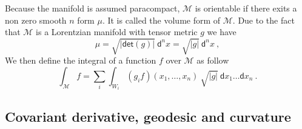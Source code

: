 \documentclass[11pt]{book}
\renewcommand{\det}{\mathsf{det}}
\newcommand{\abs}[1]{\left|#1\right|}
\newcommand{\Mcal}{\mathcal{M}}
\newcommand{\dsf}{\mathsf{d}}
\theoremstyle{break}
\begin{document}
Because the manifold is assumed paracompact, $\Mcal$ is orientable if there exits a non zero smooth $n$ form $\mu$. It is called the volume form of $\Mcal$. Due to the fact that $\Mcal$ is a Lorentzian manifold with tensor metric $g$ we have 
%
\begin{equation*}
\mu = \sqrt{\abs{\det\left(g\right)}} \ \dsf^n x = \sqrt{\abs{g}} \ \dsf^n x \ ,
\end{equation*}
%
We then define the integral of a function $f$ over $\Mcal$ as follow
%
\begin{equation}
\int_\Mcal f = \sum_i \int_{W_i} (g_i f)(x_1,\dots,x_n) \ \sqrt{\abs{g}} \ \dsf x_1 \dots \dsf x_n \ .
\label{eq:int_manifold}
\end{equation}


\subsection{Covariant derivative, geodesic and curvature}
\label{p:CONNEX_GEOD_CURV}
\end{document}
